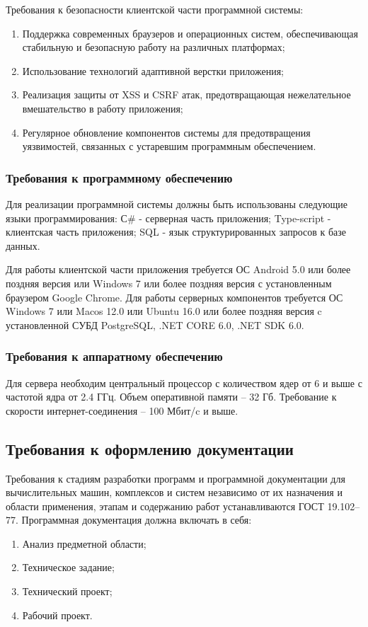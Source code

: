 Требования к безопасности клиентской части программной системы:
\begin{enumerate}
\item Поддержка современных браузеров и операционных систем, обеспечивающая стабильную и безопасную работу на различных платформах;
\item Использование технологий адаптивной верстки приложения;
\item Реализация защиты от XSS и CSRF атак, предотвращающая нежелательное вмешательство в работу приложения;
\item Регулярное обновление компонентов системы для предотвращения уязвимостей, связанных с устаревшим программным обеспечением.
\end{enumerate}

\subsubsection{Требования к программному обеспечению}
Для реализации программной системы должны быть использованы следующие языки программирования:
С\# -\- серверная часть приложения;
Type-script -\- клиентская часть приложения;
SQL -\- язык структурированных запросов к базе данных.

Для работы клиентской части приложения требуется ОС Android 5.0 или более поздняя версия или Windows 7 или более поздняя версия с установленным браузером Google Chrome.
Для работы серверных компонентов требуется ОС Windows 7 или Macos 12.0 или Ubuntu 16.0 или более поздняя версия c установленной СУБД PostgreSQL, .NET CORE 6.0, .NET SDK 6.0.

\subsubsection{Требования к аппаратному обеспечению}
Для сервера необходим центральный процессор с количеством ядер от 6 и выше с частотой ядра от 2.4 ГГц. Объем оперативной памяти – 32 Гб. Требование к скорости интернет-соединения – 100 Мбит/c и выше.

\subsection{Требования к оформлению документации}
Требования к стадиям разработки программ и программной документации для вычислительных машин, комплексов и систем независимо от их назначения и области применения, этапам и содержанию работ устанавливаются ГОСТ 19.102–77.
Программная документация должна включать в себя:

\begin{enumerate}
\item Анализ предметной области;
\item Техническое задание;
\item Технический проект;
\item Рабочий проект.
\end{enumerate}
